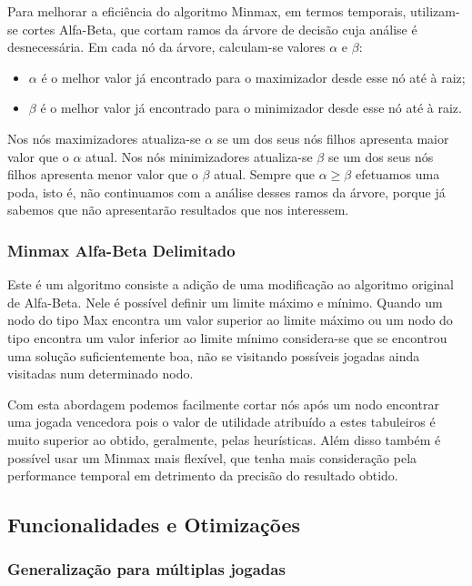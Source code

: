 Para melhorar a eficiência do algoritmo Minmax, em termos temporais, utilizam-se cortes Alfa-Beta, que cortam ramos da árvore de decisão cuja análise é desnecessária. Em cada nó da árvore, calculam-se valores $\alpha$ e $\beta$:
\begin{itemize}
	\item $\alpha$ é o melhor valor já encontrado para o maximizador desde esse nó até à raiz;
	\item $\beta$ é o melhor valor já encontrado para o minimizador desde esse nó até à raiz.
\end{itemize}
Nos nós maximizadores atualiza-se $\alpha$ se um dos seus nós filhos apresenta maior valor que o $\alpha$ atual. Nos nós minimizadores atualiza-se $\beta$ se um dos seus nós filhos apresenta menor valor que o $\beta$ atual. Sempre que $\alpha \geq \beta$ efetuamos uma poda, isto é, não continuamos com a análise desses ramos da árvore, porque já sabemos que não apresentarão resultados que nos interessem. 

\subsubsection{Minmax Alfa-Beta Delimitado}

Este é um algoritmo consiste a adição de uma modificação ao algoritmo original de Alfa-Beta. Nele é possível definir um limite máximo e mínimo. Quando um nodo do tipo Max encontra um valor superior ao limite máximo ou um nodo do tipo  encontra um valor inferior ao limite mínimo considera-se que se encontrou uma solução suficientemente boa, não se visitando possíveis jogadas ainda visitadas num determinado nodo.

Com esta abordagem podemos facilmente cortar nós após um nodo encontrar uma jogada vencedora pois o valor de utilidade atribuído a estes tabuleiros é muito superior ao obtido, geralmente, pelas heurísticas. Além disso também é possível usar um Minmax mais flexível, que tenha mais consideração pela performance temporal em detrimento da precisão do resultado obtido.

\subsection{Funcionalidades e Otimizações}

\subsubsection{Generalização para múltiplas jogadas}

